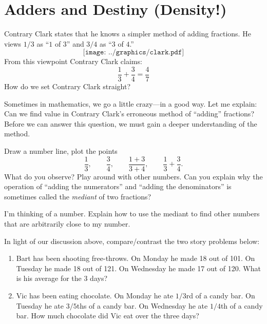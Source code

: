 \newpage
\activity\section{Adders and Destiny (Density!)}

\begin{prob} 
Contrary Clark states that he knows a simpler method of adding
fractions. He views $1/3$ as ``$1$ of $3$'' and $3/4$ as ``$3$ of
$4$.''
\[
\texttt{[image: ../graphics/clark.pdf]}
\]
From this viewpoint Contrary Clark claims:
\[
\frac{1}{3} + \frac{3}{4} = \frac{4}{7}
\]
How do we set Contrary Clark straight?
\end{prob}


Sometimes in mathematics, we go a little crazy---in a good way. Let me
explain: Can we find value in Contrary Clark's erroneous method of
``adding'' fractions? Before we can answer this question, we must gain
a deeper understanding of the method.

\begin{prob}
 Draw a number line, plot the points
\[
\frac{1}{3}, \qquad \frac{3}{4}, \qquad\frac{1+3}{3+4}, \qquad\frac{1}{3} + \frac{3}{4}.
\]
What do you observe? Play around with other numbers. Can you explain
why the operation of ``adding the numerators'' and ``adding the
denominators'' is sometimes called the \textit{mediant}
of two fractions?
\end{prob}


\begin{prob} 
I'm thinking of a number. Explain how to use the mediant to find other
numbers that are arbitrarily close to my number.
\end{prob}


\begin{prob} In light of our discussion above, compare/contrast the two story problems below:
\begin{enumerate}
\item Bart has been shooting free-throws. On Monday he made 18 out of 101. On Tuesday he made 18 out of 121. On Wednesday he made 17 out of 120. What is his average for the 3 days?
\item Vic has been eating chocolate. On Monday he ate $1/3$rd of a candy bar. On Tuesday he ate $3/5$ths of a candy bar. On Wednesday he ate $1/4$th of a candy bar. How much chocolate did Vic eat over the three days?
\end{enumerate}
\end{prob}
